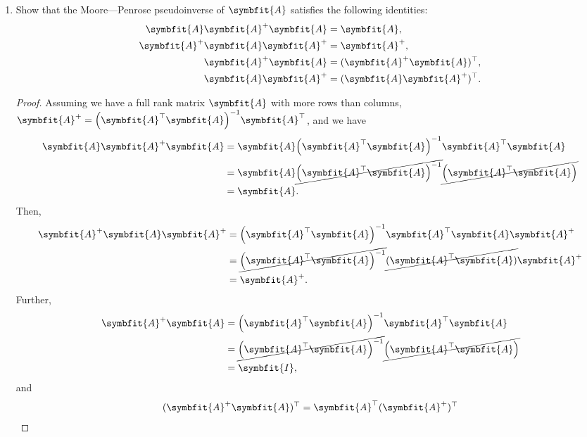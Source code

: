 \documentclass{article}
\theoremstyle{definition}
\newcommand{\mat}[1]{\symbfit{#1}}
\begin{document}
\begin{enumerate}[leftmargin=\labelsep]
	\item Show that the Moore—Penrose pseudoinverse of \(\mat{A}\) satisfies the following identities:
	      \begin{align*}
		      \mat{A}\mat{A}^+\mat{A}   & = \mat{A},                 \\
		      \mat{A}^+\mat{A}\mat{A}^+ & = \mat{A}^+,               \\
		      \mat{A}^+\mat{A}          & = (\mat{A}^+\mat{A})^\top, \\
		      \mat{A}\mat{A}^+          & = (\mat{A}\mat{A}^+)^\top.
	      \end{align*}
	      \begin{proof}
		      Assuming we have a full rank matrix \(\mat{A}\) with more rows than columns, \(\mat{A}^+=\qty(\mat{A}^{\top}\mat{A})^{-1}\mat{A}^{\top}\), and we have
		      \begin{align*}
			      \mat{A}\mat{A}^+\mat{A} & = \mat{A}\qty(\mat{A}^{\top}\mat{A})^{-1}\mat{A}^{\top}\mat{A}                          \\
			                              & = \mat{A}\cancel{\qty(\mat{A}^{\top}\mat{A})^{-1}}\cancel{\qty(\mat{A}^{\top}\mat{A}) } \\
			                              & = \mat{A}.
		      \end{align*}
		      Then,
		      \begin{align*}
			      \mat{A}^+\mat{A}\mat{A}^+ & = \qty(\mat{A}^{\top}\mat{A})^{-1}\mat{A}^{\top}\mat{A}\mat{A}^+                     \\
			                                & = \cancel{\qty(\mat{A}^{\top}\mat{A})^{-1}}\cancel{(\mat{A}^{\top}\mat{A})}\mat{A}^+ \\
			                                & = \mat{A}^+.
		      \end{align*}
		      Further,
		      \begin{align*}
			      \mat{A}^+\mat{A} & = \qty(\mat{A}^{\top}\mat{A})^{-1}\mat{A}^{\top}\mat{A}                          \\
			                       & = \cancel{\qty(\mat{A}^{\top}\mat{A})^{-1}}\cancel{\qty(\mat{A}^{\top}\mat{A}) } \\
			                       & = \mat{I},
		      \end{align*}
		      and
		      \begin{align*}
			      (\mat{A}^+\mat{A})^\top & = \mat{A}^{\top} (\mat{A}^+)^{\top}                                                \\

\end{align*}
\end{proof}
\end{enumerate}
\end{document}
